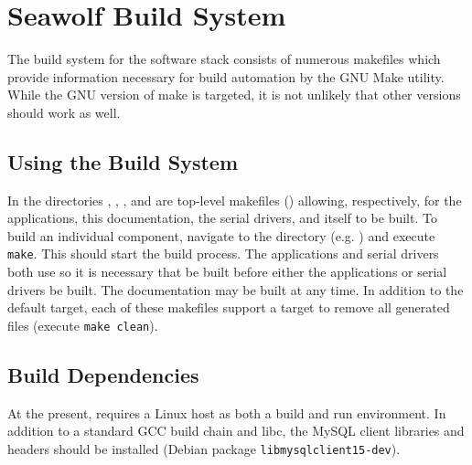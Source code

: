 
\newpage
\section{Seawolf Build System} \label{build}
The build system for the software stack consists of numerous makefiles which
provide information necessary for build automation by the GNU Make
utility. While the GNU version of make is targeted, it is not unlikely that
other versions should work as well.

\subsection{Using the Build System} \label{buildusing}
In the directories , , ,
and  are top-level makefiles () allowing,
respectively, for the applications, this documentation, the serial drivers,
and \libseawolf{} itself to be built. To build an individual component, navigate
to the directory (e.g. ) and execute \texttt{make}. This
should start the build process. The applications and serial drivers both
use \libseawolf{} so it is necessary that \libseawolf{} be built before either
the applications or serial drivers be built. The documentation may be built at
any time. In addition to the default target, each of these makefiles support a
target to remove all generated files (execute \texttt{make clean}).

\subsection{Build Dependencies} \label{builddepends}
At the present, \libseawolf{} requires a Linux host as both a build and run
environment. In addition to a standard GCC build chain and libc, the MySQL
client libraries and headers should be installed (Debian
package \texttt{libmysqlclient15-dev}).

